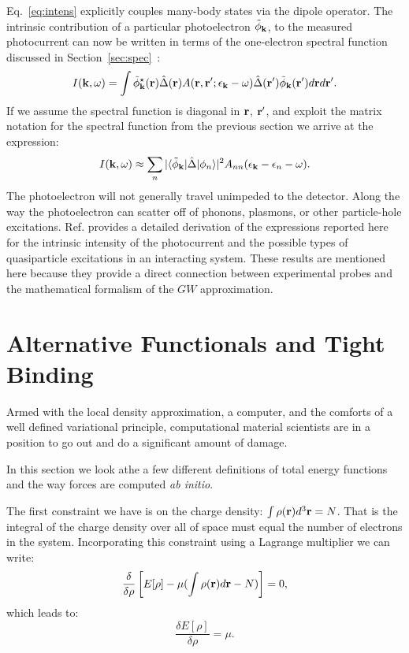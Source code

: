 Eq.~\ref{eq:intens} explicitly couples many-body states via the dipole operator.
The intrinsic contribution of a particular photoelectron $\tilde{\phi}_{{\bf k}}$, to the measured photocurrent
can now be written in terms of the one-electron spectral
function discussed in Section~\ref{sec:spec}~\cite{bardy85}:
%
\begin{equation}
\label{eq:barhed}
I({\bf k},\omega)=\int \tilde{\phi}^{\star}_{{\bf k}}({\bf r})\hat{\Delta}({\bf r})A({\bf r},{\bf r}';\epsilon_{\bf k}-\omega)\hat{\Delta}({\bf r}')\tilde{\phi}_{{\bf k}}({\bf r}')d{\bf r} d{\bf r}'.
\end{equation}
%
If we assume the spectral function is diagonal in ${\bf r}$, ${\bf r}'$, and exploit the matrix
notation for the spectral function from the previous section we arrive at the expression:
%
\begin{equation}
I({\bf k},\omega) \approx \sum_{n} |\langle\tilde{\phi}_{{\bf k}}|\hat{\Delta}|\phi_{n}\rangle|^{2} A_{nn}(\epsilon_{{\bf k}}-\epsilon_{n}-\omega).
\end{equation}
%
The photoelectron will not generally travel unimpeded to the detector. 
Along the way the photoelectron can scatter off of phonons, plasmons, 
or other particle-hole excitations.
Ref. \cite{bardy85} provides a detailed derivation of the 
expressions reported here for the intrinsic intensity
of the photocurrent and the possible types of quasiparticle 
excitations in an interacting system.
These results are mentioned here because they provide a direct 
connection between experimental probes and the mathematical 
formalism of the $GW$ approximation.

\section{Alternative Functionals and Tight Binding}
Armed with the local density approximation, a computer, 
and the comforts of a well defined variational principle,
computational material scientists are in a position 
to go out and do a significant amount of damage. 

In this section we look athe a few different definitions of
total energy functions and the way forces are computed
{\it ab initio}.


The first constraint we have is on the charge density: 
$\int\rho({\bf r})d^{3}{\bf r} = N$. That is the integral of the charge
density over all of space must equal the number of electrons 
in the system. Incorporating this
constraint using a Lagrange multiplier we can write:
%
\begin{equation}
\frac{\delta}{\delta \rho} \left[E[\rho] - \mu(\int \rho({\bf r})d{\bf r} - N)\right] = 0,
\end{equation}
%
which leads to:
%
\begin{equation}
\frac{\delta E[\rho]}{\delta \rho}= \mu.
\end{equation}

